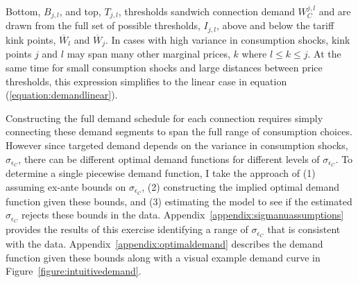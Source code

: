 \documentclass[12pt]{article}
\begin{document}
Bottom, $B_{j,l}$, and top, $T_{j,l}$, thresholds sandwich connection demand $W_C^{j,l}$ and are drawn from the full set of possible thresholds, $I_{j,l}$, above and below the tariff kink points, $\overline{W}_{l}$ and $\overline{W}_{j}$.  In cases with high variance in consumption shocks, kink points $j$ and $l$ may span many other marginal prices, $k$ where $l \leq k \leq j$.  At the same time for small consumption shocks and large distances between price thresholds, this expression simplifies to the linear case in equation (\ref{equation:demandlinear}).

Constructing the full demand schedule for each connection requires simply connecting these demand segments to span the full range of consumption choices.  However since targeted demand depends on the variance in consumption shocks, $\sigma_{\epsilon_C}$, there can be different optimal demand functions for different levels of $\sigma_{\epsilon_C}$.  To determine a single piecewise demand function, I take the approach of (1) assuming ex-ante bounds on $\sigma_{\epsilon_C}$, (2) constructing the implied optimal demand function given these bounds, and (3) estimating the model to see if the estimated $\sigma_{\epsilon_C}$ rejects these bounds in the data.  Appendix~\ref{appendix:sigmanuassumptions} provides the results of this exercise identifying a range of $\sigma_{\epsilon_C}$ that is consistent with the data.  Appendix~\ref{appendix:optimaldemand} describes the demand function given these bounds along with a visual example demand curve in Figure~\ref{figure:intuitivedemand}.

\end{document}
